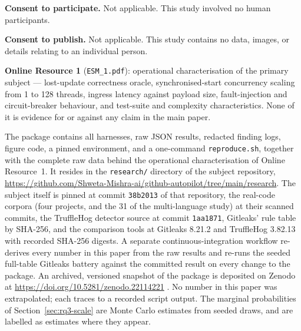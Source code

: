 \documentclass[pdflatex,sn-basic]{sn-jnl}
\begin{document}
\textbf{Consent to participate.} Not applicable. This study involved no human participants.

\textbf{Consent to publish.} Not applicable. This study contains no data, images, or details relating to an individual person.

\textbf{Online Resource 1} (\texttt{ESM\_1.pdf}): operational characterisation of the primary subject --- lost-update correctness oracle, synchronised-start concurrency scaling from 1 to 128 threads, ingress latency against payload size, fault-injection and circuit-breaker behaviour, and test-suite and complexity characteristics. None of it is evidence for or against any claim in the main paper.

The package contains all harnesses, raw JSON results, redacted finding logs, figure code, a pinned environment, and a one-command \texttt{reproduce.sh}, together with the complete raw data behind the operational characterisation of Online Resource~1. It resides in the \texttt{research/} directory of the subject repository, \url{https://github.com/Shweta-Mishra-ai/github-autopilot/tree/main/research}. The subject itself is pinned at commit \texttt{38b2013} of that repository, the real-code corpora (four projects, and the 31 of the multi-language study) at their scanned commits, the TruffleHog detector source at commit \texttt{1aa1871}, Gitleaks' rule table by SHA-256, and the comparison tools at Gitleaks 8.21.2 and TruffleHog 3.82.13 with recorded SHA-256 digests. A separate continuous-integration workflow re-derives every number in this paper from the raw results and re-runs the seeded full-table Gitleaks battery against the committed result on every change to the package. An archived, versioned snapshot of the package is deposited on Zenodo at \url{https://doi.org/10.5281/zenodo.22114221} \citep{mishra2026zenodo}. No number in this paper was extrapolated; each traces to a recorded script output. The marginal probabilities of Section~\ref{sec:rq3-scale} are Monte Carlo estimates from seeded draws, and are labelled as estimates where they appear.



\end{document}
